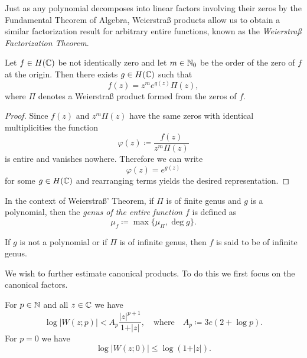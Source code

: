 Just as any polynomial decomposes into linear factors involving their zeros by the Fundamental Theorem of Algebra, Weierstraß products allow us to obtain a similar factorization result for arbitrary entire functions, known as the \emph{Weierstraß Factorization Theorem}.

\begin{theorem}[Weierstraß] \label{thm:Weierstraß}
    Let $f \in H(\mathbb{C})$ be not identically zero and let $m \in \mathbb{N}_0$ be the order of the zero of $f$ at the origin. Then there exists $g \in H(\mathbb{C})$ such that
    \begin{equation}
        f(z) = z^m e^{g(z)} \Pi(z),
    \end{equation}
    where $\Pi$ denotes a Weierstraß product formed from the zeros of $f$.
\end{theorem}

\begin{proof}
    Since $f(z)$ and $z^m \Pi(z)$ have the same zeros with identical multiplicities the function
    $$ \varphi(z) \coloneqq \frac{f(z)}{z^m \Pi(z)} $$
    is entire and vanishes nowhere. Therefore we can write
    $$ \varphi(z) = e^{g(z)} $$
    for some $g \in H(\mathbb{C})$ and rearranging terms yields the desired representation.
\end{proof}

\begin{definition} \label{def:genus}
    In the context of Weierstraß' Theorem, if $\Pi$ is of finite genus and $g$ is a polynomial, then the \emph{genus of the entire function $f$} is defined as
    \begin{equation}
        \mu_f \coloneqq \max \{ \mu_\Pi, \deg g \}.
    \end{equation}

    If $g$ is not a polynomial or if $\Pi$ is of infinite genus, then $f$ is said to be of infinite genus.
\end{definition}

We wish to further estimate canonical products. To do this we first focus on the canonical factors.

\begin{lemma} \label{lem:elementary-factor-estimate}
    For $p \in \mathbb{N}$ and all $z \in \mathbb{C}$ we have
    \begin{equation}
        \log \vert W(z; p) \vert < A_p \frac{\vert z \vert^{p+1}}{1 + \vert z \vert}, \quad \textrm{where} \quad A_p \coloneqq 3e (2 + \log p).
    \end{equation}
    For $p = 0$ we have
    \begin{equation}
        \log \vert W(z; 0) \vert \leq \log (1 + \vert z \vert).
    \end{equation}
\end{lemma}

